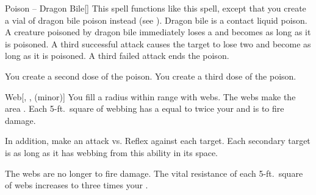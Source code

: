 \lowercase{\hypertarget{spell:Poison -- Dragon Bile}{}}\label{spell:Poison -- Dragon Bile}
\begin{freeability}[Rank 3]{\hypertarget{spell:Poison -- Dragon Bile}{Poison -- Dragon Bile}}[]
This spell functions like this  spell, except that you create a vial of dragon bile poison instead (see ).
Dragon bile is a contact liquid poison.
A creature poisoned by dragon bile immediately loses a  and becomes  as long as it is poisoned.
A third successful attack causes the target to lose two  and become  as long as it is poisoned.
A third failed attack ends the poison.

\rankline
{} You create a second dose of the poison.
 You create a third dose of the poison.
\end{freeability}
\vspace{0.25em}



\lowercase{\hypertarget{spell:Web}{}}\label{spell:Web}
\begin{freeability}[Rank 3]{\hypertarget{spell:Web}{Web}}[, ,  (minor)]
You fill a \areasmall radius  within \rngclose range with webs.
The webs make the area .
Each 5-ft.\ square of webbing has a  equal to twice your  and is  to fire damage.

In addition, make an attack vs. Reflex against each target.
\hit Each secondary target is  as long as it has webbing from this ability in its space.

\rankline
{} The webs are no longer  to fire damage.
 The vital resistance of each 5-ft.\ square of webs increases to three times your .
\end{freeability}
\vspace{0.25em}



